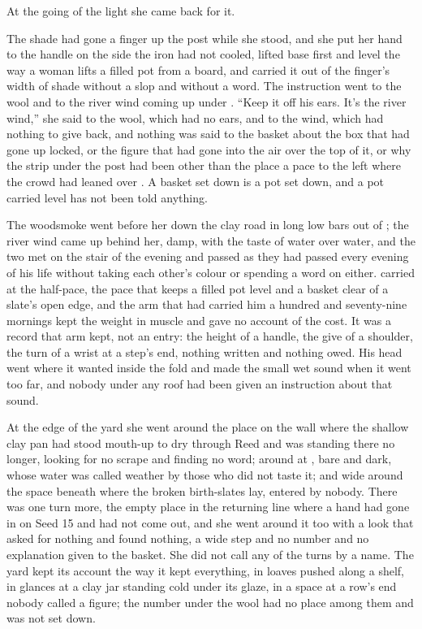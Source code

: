At the going of the light she came back for it.

The shade had gone a finger up the post while she stood, and she put her hand to the handle on the side the iron had not cooled, lifted base first and level the way a woman lifts a filled pot from a board, and carried it out of the finger's width of shade without a slop and without a word. The instruction went to the wool and to the river wind coming up under . “Keep it off his ears. It's the river wind,” she said to the wool, which had no ears, and to the wind, which had nothing to give back, and nothing was said to the basket about the box that had gone up  locked, or the figure that had gone into the air over the top of it, or why the strip under the post had been other than the place a pace to the left where the crowd had leaned over . A basket set down is a pot set down, and a pot carried level has not been told anything.

The woodsmoke went before her down the clay road in long low bars out of ; the river wind came up behind her, damp, with the taste of water over water, and the two met on the stair of the evening and passed as they had passed every evening of his life without taking each other's colour or spending a word on either.  carried  at the half-pace, the pace that keeps a filled pot level and a basket clear of a slate's open edge, and the arm that had carried him a hundred and seventy-nine mornings kept the weight in muscle and gave no account of the cost. It was a record that arm kept, not an entry: the height of a handle, the give of a shoulder, the turn of a wrist at a step's end, nothing written and nothing owed. His head went where it wanted inside the fold and made the small wet sound when it went too far, and nobody under any roof had been given an instruction about that sound.

At the edge of the yard she went around the place on the wall where the shallow clay pan had stood mouth-up to dry through Reed and was standing there no longer, looking for no scrape and finding no word; around  at , bare and dark, whose water was called weather by those who did not taste it; and wide around the space beneath  where the broken birth-slates lay, entered by nobody. There was one turn more, the empty place in the returning line where a hand had gone in on Seed 15 and had not come out, and she went around it too with a look that asked for nothing and found nothing, a wide step and no number and no explanation given to the basket. She did not call any of the turns by a name. The yard kept its account the way it kept everything, in loaves pushed along a shelf, in glances at a clay jar standing cold under its glaze, in a space at a row's end nobody called a figure; the number under the wool had no place among them and was not set down.

